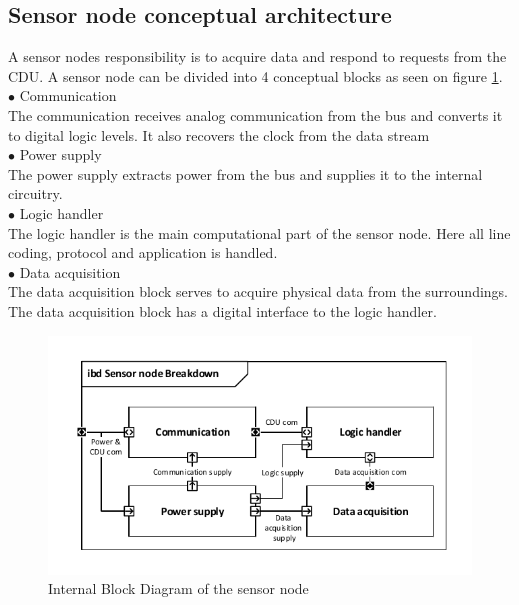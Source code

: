 \subsection{Sensor node conceptual architecture}
A sensor nodes responsibility is to acquire data and respond to requests from the CDU. A sensor node can be divided into 4 conceptual blocks as seen on figure \ref{fig:SN_IBD}. \\
\hspace*{.6cm}$\bullet$ Communication\\
The communication receives analog communication from the bus and converts it to digital logic levels. It also recovers the clock from the data stream\\
\hspace*{.6cm}$\bullet$ Power supply\\
The power supply extracts power from the bus and supplies it to the internal circuitry.\\
\hspace*{.6cm}$\bullet$ Logic handler\\
The logic handler is the main computational part of the sensor node. Here all line coding, protocol and application is handled.\\
\hspace*{.6cm}$\bullet$ Data acquisition\\
The data acquisition block serves to acquire physical data from the surroundings. The data acquisition block has a digital interface to the logic handler.\\
\begin{figure}[H]
\centering
\includegraphics[width=.8\textwidth]{billeder/11ProjectDescription/Sensor_IBD}
\caption{Internal Block Diagram of the sensor node}
\label{fig:SN_IBD}
\end{figure}
